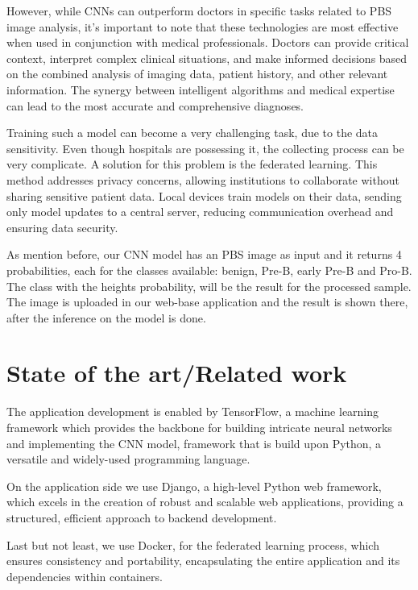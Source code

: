 \documentclass[runningheads,a4paper,11pt]{report}
\begin{document}
However, while CNNs can outperform doctors in specific tasks related to PBS image analysis, it's important to note that these technologies are most effective when used in conjunction with medical professionals. Doctors can provide critical context, interpret complex clinical situations, and make informed decisions based on the combined analysis of imaging data, patient history, and other relevant information. The synergy between intelligent algorithms and medical expertise can lead to the most accurate and comprehensive diagnoses.

Training such a model can become a very challenging task, due to the data sensitivity. Even though hospitals are possessing it, the collecting process can be very complicate. A solution for this problem is the federated learning. This method addresses privacy concerns, allowing institutions to collaborate without sharing sensitive patient data. Local devices train models on their data, sending only model updates to a central server, reducing communication overhead and ensuring data security.

As mention before, our CNN model has an PBS image as input and it returns 4 probabilities, each for the classes available: benign, Pre-B, early Pre-B and Pro-B. The class with the heights probability, will be the result for the processed sample. The image is uploaded in our web-base application and the result is shown there, after the inference on the model is done.



\chapter{State of the art/Related work}
\label{chapter:stateOfArt}

The application development is enabled by TensorFlow, a machine learning framework which provides the backbone for building intricate neural networks and implementing the CNN model, framework that is build upon Python, a versatile and widely-used programming language. 

On the application side we use Django, a high-level Python web framework, which excels in the creation of robust and scalable web applications, providing a structured, efficient approach to backend development. 

Last but not least, we use Docker, for the federated learning process, which ensures consistency and portability, encapsulating the entire application and its dependencies within containers.
\end{document}
